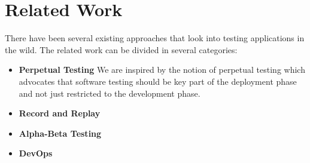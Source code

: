 
\section{Related Work}
\label{sec:related}

There have been several existing approaches that look into testing applications in the wild. 
The related work can be divided in several categories:

\begin{itemize}
  \item \textbf{Perpetual Testing}
    We are inspired by the notion of perpetual testing\cite{perpetual} which advocates that software testing should be key part of the deployment phase and not just restricted to the development phase.
  \item \textbf{Record and Replay}
  \item \textbf{Alpha-Beta Testing}  
   \item \textbf{DevOps}
\end{itemize}
  

